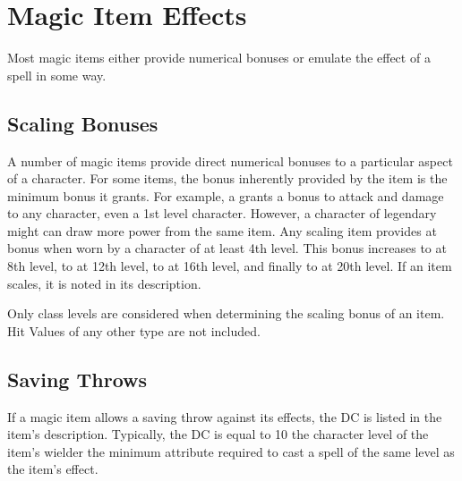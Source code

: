 \section{Magic Item Effects}
Most magic items either provide numerical bonuses or emulate the effect of a spell in some way.

\subsection{Scaling Bonuses}\label{Scaling Bonuses}
A number of magic items provide direct numerical bonuses to a particular aspect of a character. For some items, the bonus inherently provided by the item is the minimum bonus it grants. For example, a  grants a  bonus to attack and damage to any character, even a 1st level character. However, a character of legendary might can draw more power from the same item. Any scaling item provides at  bonus when worn by a character of at least 4th level. This bonus increases to  at 8th level, to  at 12th level, to  at 16th level, and finally to  at 20th level. If an item scales, it is noted in its description.

Only class levels are considered when determining the scaling bonus of an item. Hit Values of any other type are not included.

\subsection{Saving Throws}

If a magic item allows a saving throw against its effects, the DC is listed in the item's description. Typically, the DC is equal to 10 \add the character level of the item's wielder \add the minimum attribute required to cast a spell of the same level as the item's effect.

\begin{comment}
\subsection{Charges, Doses, and Multiple Uses}

Many items, particularly wands and staffs, are limited in power by the number of charges they hold. Normally, charged items have 50 charges at most. If such an item is found as a random part of a treasure, roll d\% and divide by 2 to determine the number of charges left (round down, minimum 1). If the item has a maximum number of charges other than 50, roll randomly to determine how many charges are left.

Prices listed are always for fully charged items. (When an item is created, it is fully charged.) An item with no charges left is worth half the price of a fully charged item. For an item that's worthless when its charges run out (which is the case for almost all charged items), the value of the partially used item is proportional to the number of charges left. For an item that has usefulness in addition to its charges, only part of the item's value is based on the number of charges left.
\end{comment}

